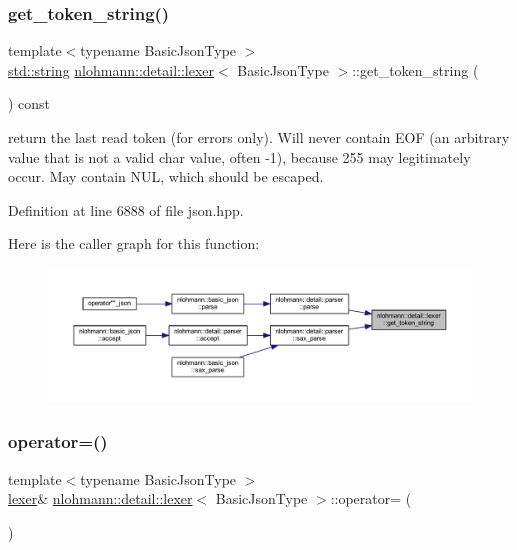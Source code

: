 \subsubsection{\texorpdfstring{get\_token\_string()}{get\_token\_string()}}
{\footnotesize\ttfamily template$<$typename Basic\+Json\+Type $>$ \\
\mbox{\hyperlink{namespacenlohmann_1_1detail_a1ed8fc6239da25abcaf681d30ace4985ab45cffe084dd3d20d928bee85e7b0f21}{std\+::string}} \mbox{\hyperlink{classnlohmann_1_1detail_1_1lexer}{nlohmann\+::detail\+::lexer}}$<$ Basic\+Json\+Type $>$\+::get\+\_\+token\+\_\+string (\begin{DoxyParamCaption}{ }\end{DoxyParamCaption}) const\hspace{0.3cm}{\ttfamily [inline]}}

return the last read token (for errors only). Will never contain E\+OF (an arbitrary value that is not a valid char value, often -\/1), because 255 may legitimately occur. May contain N\+UL, which should be escaped. 

Definition at line 6888 of file json.\+hpp.

Here is the caller graph for this function\+:
\nopagebreak
\begin{figure}[H]
\begin{center}
\leavevmode
\includegraphics[width=350pt]{classnlohmann_1_1detail_1_1lexer_a4aef7e72e539be04e139c34872421f2a_icgraph}
\end{center}
\end{figure}
\mbox{\label{classnlohmann_1_1detail_1_1lexer_a33e97dee7c5faf1b36aff5b74a6c8f55}} 
\subsubsection{\texorpdfstring{operator=()}{operator=()}\hspace{0.1cm}{\footnotesize\ttfamily [1/2]}}
{\footnotesize\ttfamily template$<$typename Basic\+Json\+Type $>$ \\
\mbox{\hyperlink{classnlohmann_1_1detail_1_1lexer}{lexer}}\& \mbox{\hyperlink{classnlohmann_1_1detail_1_1lexer}{nlohmann\+::detail\+::lexer}}$<$ Basic\+Json\+Type $>$\+::operator= (\begin{DoxyParamCaption}\item[{\mbox{\hyperlink{classnlohmann_1_1detail_1_1lexer}{lexer}}$<$ Basic\+Json\+Type $>$ \&}]{ }\end{DoxyParamCaption})\hspace{0.3cm}{\ttfamily [delete]}}

